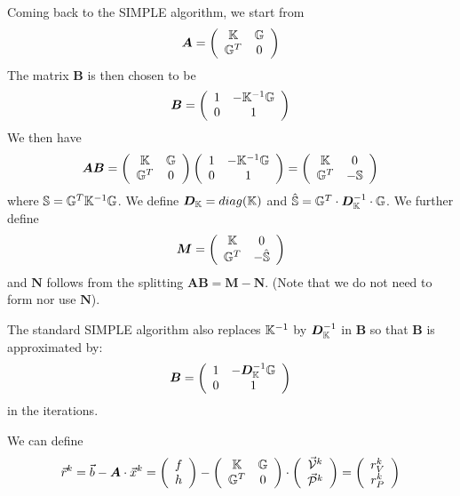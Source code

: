 Coming back to the SIMPLE algorithm, we start from 
\[
{\bm A}=
\left(
\begin{array}{cc}
{\mathbb{K}} & {\mathbb{G}} \\
{\mathbb{G}}^T & 0
\end{array}
\right)
\]
The matrix ${\bm B}$ is then chosen to be 
\[
{\bm B}=
\left(
\begin{array}{cc}
1 & -{\mathbb{K}}^{-1} {\mathbb{G}} \\
0 & 1
\end{array}
\right)
\]
We then have 
\[
{\bm A} {\bm B} = 
\left(
\begin{array}{cc}
{\mathbb{K}} & {\mathbb{G}} \\
{\mathbb{G}}^T & 0
\end{array}
\right)
\left(
\begin{array}{cc}
1 & -{\mathbb{K}}^{-1} {\mathbb{G}} \\
0 & 1
\end{array}
\right)
=
\left(
\begin{array}{cc}
{\mathbb{K}} & 0 \\
{\mathbb{G}}^T & -{\mathbb{S}}
\end{array}
\right)
\]
where ${\mathbb{S}}={\mathbb{G}}^T{\mathbb{K}}^{-1}{\mathbb{G}}$.
We define ${\bm D}_{\mathbb{K}} =diag({\mathbb{K}})$ and $\hat{{\mathbb{S}}}={\mathbb{G}}^T \cdot {\bm D}_{\mathbb{K}}^{-1} \cdot {\mathbb{G}}$. 
We further define 
\[
{\bm M}=
\left(
\begin{array}{cc}
{\mathbb{K}} & 0 \\
{\mathbb{G}}^T & -\hat{{\mathbb{S}}}
\end{array}
\right)
\]
and ${\bm N}$ follows from the splitting ${\bm A}{\bm B}= {\bm M} - {\bm N}$. 
(Note that we do not need to form nor use ${\bm N}$).

The standard SIMPLE algorithm also replaces ${\mathbb{K}}^{-1}$  by  ${\bm D}_{\mathbb{K}}^{-1}$ in ${\bm B}$ so that 
${\bm B}$ is approximated by:
\[
{\bm B}=
\left(
\begin{array}{cc}
1 & -{\bm D}_{\mathbb{K}}^{-1} {\mathbb{G}} \\
0 & 1
\end{array}
\right)
\]
in the iterations.


We can define 
\[
\vec{r}^k=
\vec{b}-{\bm A}\cdot \vec{x}^k = 
\left(
\begin{array}{c}
f \\ h
\end{array}
\right)
-
\left(
\begin{array}{cc}
{\mathbb{K}} & {\mathbb{G}} \\
{\mathbb{G}}^T & 0
\end{array}
\right)
\cdot
\left(
\begin{array}{c}
\vec{\cal V}^k \\ \vec{\cal P}^k
\end{array}
\right)
=
\left(
\begin{array}{c}
r_V^k \\ r_P^k
\end{array}
\right)
\]

